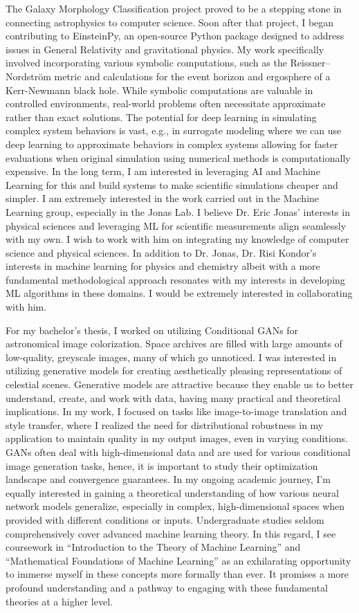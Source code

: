 \documentclass{article}
\begin{document}
The Galaxy Morphology Classification project proved to be a stepping stone in
connecting astrophysics to computer science. Soon after that project, I began
contributing to EinsteinPy, an open-source Python package designed to address
issues in General Relativity and gravitational physics. My work specifically
involved incorporating various symbolic computations, such as the
Reissner–Nordström metric and calculations for the event horizon and ergosphere
of a Kerr-Newmann black hole. While symbolic computations are valuable in
controlled environments, real-world problems often necessitate approximate
rather than exact solutions. The potential for deep learning in simulating
complex system behaviors is vast, e.g., in surrogate modeling where we can use
deep learning to approximate behaviors in complex systems allowing for faster
evaluations when original simulation using numerical methods is computationally
expensive. In the long term, I am interested in leveraging AI and Machine
Learning for this and build systems to make scientific simulations cheaper and
simpler. I am extremely interested in the work carried out in the Machine
Learning group, especially in the Jonas Lab. I believe Dr. Eric Jonas’ interests
in physical sciences and leveraging ML for scientific measurements align
seamlessly with my own. I wish to work with him on integrating my knowledge of
computer science and physical sciences. In addition to Dr. Jonas, Dr. Risi
Kondor’s interests in machine learning for physics and chemistry albeit with a
more fundamental methodological approach resonates with my interests in
developing ML algorithms in these domains. I would be extremely interested in
collaborating with him.

For my bachelor’s thesis, I worked on utilizing Conditional GANs for
astronomical image colorization. Space archives are filled with large amounts of
low-quality, greyscale images, many of which go unnoticed. I was interested in
utilizing generative models for creating aesthetically pleasing representations
of celestial scenes. Generative models are attractive because they enable us to
better understand, create, and work with data, having many practical and
theoretical implications. In my work, I focused on tasks like image-to-image
translation and style transfer, where I realized the need for distributional
robustness in my application to maintain quality in my output images, even in
varying conditions. GANs often deal with high-dimensional data and are used for
various conditional image generation tasks, hence, it is important to study
their optimization landscape and convergence guarantees. In my ongoing academic
journey, I’m equally interested in gaining a theoretical understanding of how
various neural network models generalize, especially in complex,
high-dimensional spaces when provided with different conditions or inputs.
Undergraduate studies seldom comprehensively cover advanced machine learning
theory. In this regard, I see coursework in “Introduction to the Theory of
Machine Learning” and “Mathematical Foundations of Machine Learning” as an
exhilarating opportunity to immerse myself in these concepts more formally than
ever. It promises a more profound understanding and a pathway to engaging with
these fundamental theories at a higher level.
\end{document}
